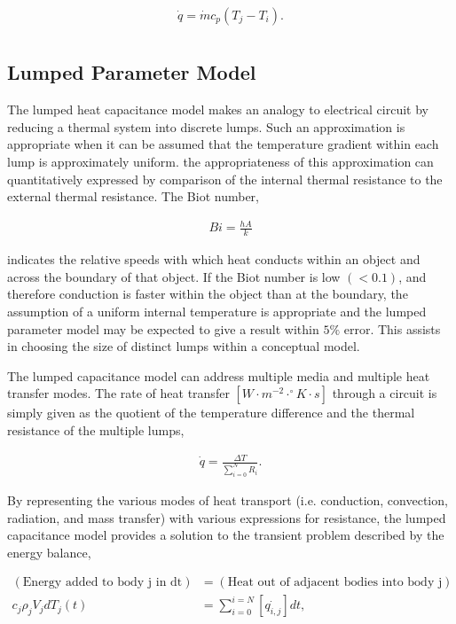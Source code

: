 \begin{align*}
  \dot{q} = \dot{m}c_p\left( T_j - T_i \right).\\
\end{align*}

\subsection{Lumped Parameter Model}

The lumped heat capacitance model makes an analogy to electrical circuit by 
reducing a thermal system into discrete lumps. Such an approximation is 
appropriate when it can be assumed that the temperature gradient within each 
lump is approximately uniform. the appropriateness of this approximation can 
quantitatively expressed by comparison of the internal thermal resistance to the 
external thermal resistance. The Biot number, 

\begin{align}
  Bi = \frac{hA}{k}
  \label{biot}
\end{align}

indicates the relative speeds with which heat conducts within an object and 
across the boundary of that object. If the Biot number is low $(<0.1)$, and 
therefore conduction is faster within the object than at the boundary, the 
assumption of a uniform internal temperature is appropriate and the lumped 
parameter model may be expected to give a result within $5\%$ 
error\cite{incropera_fundamentals_2006}. This assists in choosing the size of 
distinct lumps within a conceptual model. 

The lumped capacitance model can address multiple media and multiple heat
transfer modes. The rate of heat transfer $[W \cdot m^{-2}\cdot^{\circ}K\cdot 
s]$ through a circuit is simply given as the quotient of the temperature 
difference and the thermal resistance of the multiple lumps,

\begin{align*}
  \dot{q} = \frac{\Delta T}{\sum _{i=0}^{N}R_i}.
\end{align*}

By representing the various modes of heat transport (i.e. conduction, 
convection, radiation, and mass transfer) with various expressions for 
resistance, the lumped capacitance model provides a solution to the transient 
problem described by the energy balance,

\begin{align*}
  \left( \mbox{Energy added to body j in dt} \right) &= \left( \mbox{Heat 
  out of adjacent bodies into body j} \right)\\
  c_j\rho_j V_j dT_j(t) &= \sum_{i=0}^{i=N}\left[\dot{q_{i,j}}\right]dt,
\end{align*}

